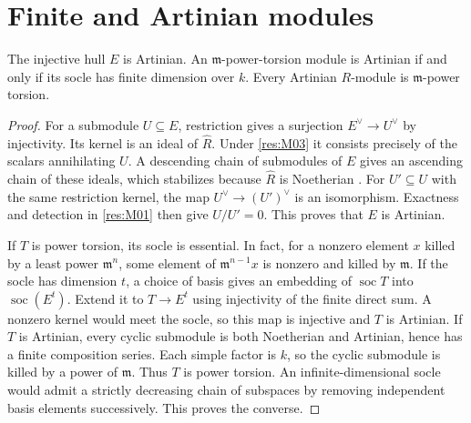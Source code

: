 \section{Finite and Artinian modules}

\begin{proposition}\label{res:M04}
The injective hull $E$ is Artinian. An $\mathfrak m$-power-torsion
module is Artinian if and only if its socle has finite dimension
over $k$. Every Artinian $R$-module is $\mathfrak m$-power torsion.
\end{proposition}
\begin{proof}
For a submodule $U\subseteq E$, restriction gives a surjection
$E^\vee\to U^\vee$ by injectivity. Its kernel is an ideal of
$\widehat R$. Under \ref{res:M03} it consists precisely of the scalars
annihilating $U$. A descending chain of submodules of $E$ gives an
ascending chain of these ideals, which stabilizes because $\widehat R$
is Noetherian \cite[ALG-05-C04-S01]{p103}. For $U'\subseteq U$ with
the same restriction kernel, the map $U^\vee\to (U')^\vee$ is an
isomorphism. Exactness and detection in \ref{res:M01} then give
$U/U'=0$. This proves that $E$ is Artinian.

If $T$ is power torsion, its socle is essential. In fact, for a nonzero
element $x$ killed by a least power $\mathfrak m^n$, some element of
$\mathfrak m^{n-1}x$ is nonzero and killed by $\mathfrak m$. If the
socle has dimension $t$, a choice of basis gives an embedding of
$\operatorname{soc}T$ into $\operatorname{soc}(E^t)$. Extend it to
$T\to E^t$ using injectivity of the finite direct sum. A nonzero kernel
would meet the socle, so this map is injective and $T$ is Artinian.
If $T$ is Artinian, every cyclic submodule is both Noetherian and
Artinian, hence has a finite composition series. Each simple factor
is $k$, so the cyclic submodule is killed by a power of $\mathfrak m$.
Thus $T$ is power torsion. An infinite-dimensional socle would admit
a strictly decreasing chain of subspaces by removing independent basis
elements successively. This proves the converse.
\end{proof}

